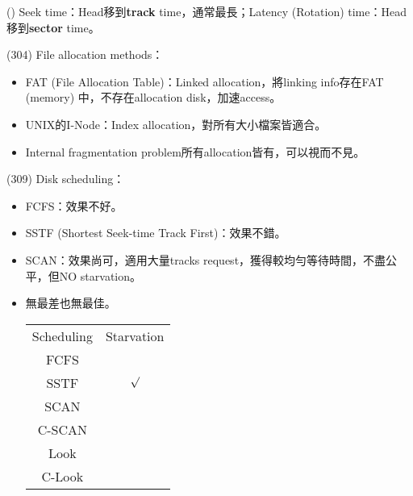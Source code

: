 \begin{theorem}{()} Seek time：Head移到\textbf{track} time，通常最長；Latency (Rotation) time：Head移到\textbf{sector} time。
\end{theorem}

\begin{theorem}{(304)} File allocation methods：\begin{itemize}
        \item FAT (File Allocation Table)：Linked allocation，將linking info存在FAT (memory) 中，不存在allocation disk，加速access。
        \item UNIX的I-Node：Index allocation，對所有大小檔案皆適合。
        \item Internal fragmentation problem所有allocation皆有，可以視而不見。
    \end{itemize}
\end{theorem}

\begin{theorem}{(309)} Disk scheduling：\begin{itemize}
        \item FCFS：效果不好。
        \item SSTF (Shortest Seek-time Track First)：效果不錯。
        \item SCAN：效果尚可，適用大量tracks request，獲得較均勻等待時間，不盡公平，但NO starvation。
        \item 無最差也無最佳。
        \begin{table}[H]
            \centering
            \begin{tabular}{|c|c|}
                \hline
                Scheduling & Starvation \\
                \Xhline{2\arrayrulewidth}
                FCFS & \\
                \hline
                SSTF & $\surd$ \\
                \hline
                SCAN & \\
                \hline
                C-SCAN & \\
                \hline
                Look & \\
                \hline
                C-Look & \\
                \hline
            \end{tabular}
        \end{table}
    \end{itemize}
\end{theorem}
